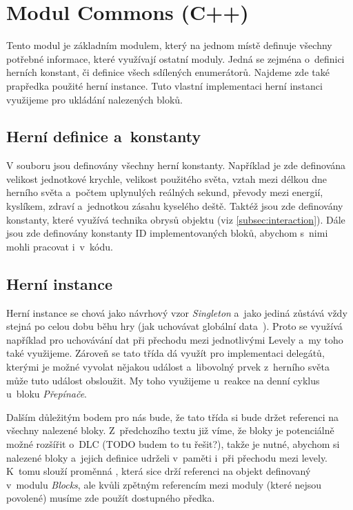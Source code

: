 
\section{Modul Commons (C++)}

Tento modul je základním modulem, který na jednom místě definuje všechny potřebné informace, které využívají ostatní moduly. Jedná se zejména o~definici herních konstant, či definice všech sdílených enumerátorů. Najdeme zde také prapředka použité herní instance. Tuto vlastní implementaci herní instanci využijeme pro ukládání nalezených bloků.

\subsection{Herní definice a~konstanty}



V souboru jsou definovány všechny herní konstanty. Například je zde definována velikost jednotkové krychle, velikost použitého světa, vztah mezi délkou dne herního světa a~počtem uplynulých reálných sekund, převody mezi energií, kyslíkem, zdraví a~jednotkou zásahu kyselého deště. Taktéž jsou zde definovány konstanty, které využívá technika obrysů objektu (viz \ref{subsec:interaction}). Dále jsou zde definovány konstanty ID implementovaných bloků, abychom s~nimi mohli pracovat i~v~kódu.

\subsection{Herní instance}

Herní instance  se chová jako návrhový vzor \textit{Singleton} a~jako jediná zůstává vždy stejná po celou dobu běhu hry (jak uchovávat globální data~\citep{ue_gameInstance}). Proto se využívá například pro uchovávání dat při přechodu mezi jednotlivými Levely a~my toho také využijeme. Zároveň se tato třída dá využít pro implementaci delegátů, kterými je možné vyvolat nějakou událost a~libovolný prvek z~herního světa může tuto událost obsloužit. My toho využijeme u~reakce na denní cyklus u~bloku \textit{Přepínače}.

Dalším důležitým bodem pro nás bude, že tato třída si bude držet referenci na všechny nalezené bloky. Z~předchozího textu již víme, že bloky je potenciálně možné rozšířit o~DLC (TODO budem to tu řešit?), takže je nutné, abychom si nalezené bloky a~jejich definice udrželi v~paměti i~při přechodu mezi levely. K~tomu slouží proměnná , která sice drží referenci na objekt definovaný v~modulu \textit{Blocks}, ale kvůli zpětným referencím mezi moduly (které nejsou povolené) musíme zde použít dostupného předka.

